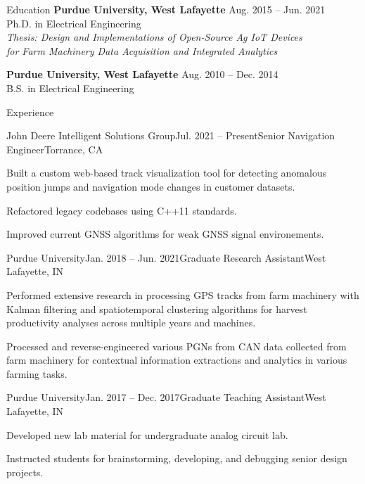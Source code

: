 \documentclass{resume}
\begin{document}
  \begin{rSection}{Education}
    {\bf Purdue University, West Lafayette} \hfill {Aug. 2015 -- Jun. 2021}
    \\ 
    {Ph.D. in Electrical Engineering} \\
    \textit{Thesis: Design and Implementations of Open-Source Ag IoT Devices \\
      for Farm Machinery Data Acquisition and Integrated Analytics}

    {\bf Purdue University, West Lafayette} \hfill {Aug. 2010 -- Dec. 2014}
    \\ 
    {B.S. in Electrical Engineering} \\
  \end{rSection}

  \begin{rSection}{Experience}
    \begin{rSubsection}{John Deere Intelligent Solutions Group}{Jul. 2021 --
      Present}{Senior Navigation Engineer}{Torrance, CA}
      \item Built a custom web-based track visualization tool for detecting
        anomalous position jumps and navigation mode changes in customer
        datasets.
      \item Refactored legacy codebases using C++11 standards.
      \item Improved current GNSS algorithms for weak GNSS signal environements. 
    \end{rSubsection}

    \begin{rSubsection}{Purdue University}{Jan. 2018 -- Jun. 2021}{Graduate
        Research Assistant}{West Lafayette, IN}
      \item Performed extensive research in processing GPS tracks from farm
        machinery with Kalman filtering and spatiotemporal clustering algorithms
        for harvest productivity analyses across multiple years and machines.
      \item Processed and reverse-engineered various PGNs from CAN data
        collected from farm machinery for contextual information extractions and
        analytics in various farming tasks.
    \end{rSubsection}

    \begin{rSubsection}{Purdue University}{Jan. 2017 --
        Dec. 2017}{Graduate Teaching Assistant}{West Lafayette, IN}
      \item Developed new lab material for undergraduate analog circuit lab.
      \item Instructed students for brainstorming, developing, and debugging
        senior design projects. 
    \end{rSubsection}


\end{rSection}
\end{document}
